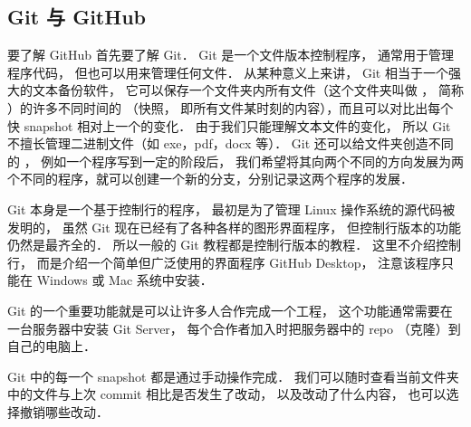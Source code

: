 
\subsection{Git 与 GitHub}
要了解 GitHub 首先要了解 Git． Git 是一个文件版本控制程序， 通常用于管理程序代码， 但也可以用来管理任何文件． 从某种意义上来讲， Git 相当于一个强大的文本备份软件， 它可以保存一个文件夹内所有文件（这个文件夹叫做 ， 简称 ）的许多不同时间的 （快照， 即所有文件某时刻的内容），而且可以对比出每个快 snapshot 相对上一个的变化． 由于我们只能理解文本文件的变化， 所以 Git 不擅长管理二进制文件（如 exe，pdf，docx 等）． Git 还可以给文件夹创造不同的 ， 例如一个程序写到一定的阶段后， 我们希望将其向两个不同的方向发展为两个不同的程序，就可以创建一个新的分支，分别记录这两个程序的发展．

Git 本身是一个基于控制行的程序， 最初是为了管理 Linux 操作系统的源代码被发明的， 虽然 Git 现在已经有了各种各样的图形界面程序， 但控制行版本的功能仍然是最齐全的． 所以一般的 Git 教程都是控制行版本的教程． 这里不介绍控制行， 而是介绍一个简单但广泛使用的界面程序 GitHub Desktop， 注意该程序只能在 Windows 或 Mac 系统中安装．

Git 的一个重要功能就是可以让许多人合作完成一个工程， 这个功能通常需要在一台服务器中安装 Git Server， 每个合作者加入时把服务器中的 repo （克隆）到自己的电脑上．

Git 中的每一个 snapshot 都是通过手动操作完成． 我们可以随时查看当前文件夹中的文件与上次 commit 相比是否发生了改动， 以及改动了什么内容， 也可以选择撤销哪些改动．
 
